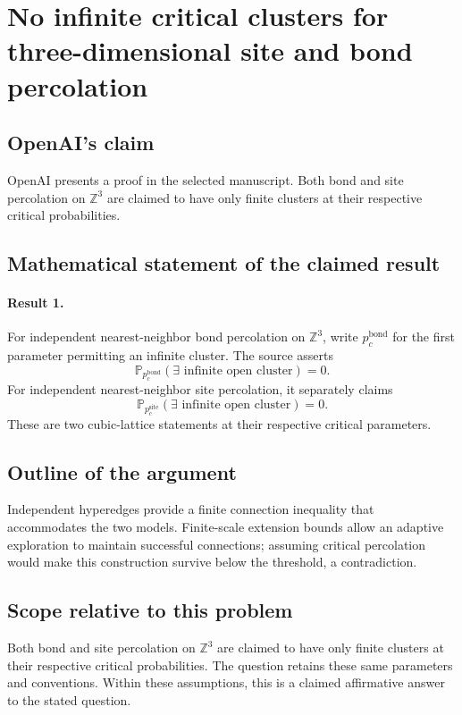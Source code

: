 \documentclass[11pt]{article}
\begin{document}
\section*{No infinite critical clusters for three-dimensional site and bond percolation}

\subsection{OpenAI's claim}
OpenAI presents a proof in the selected manuscript. Both bond and site percolation on $\mathbb Z^3$ are claimed to have only finite clusters at their respective critical probabilities.

\subsection{Mathematical statement of the claimed result}
\paragraph{Result 1.} For independent nearest-neighbor bond percolation on \(\mathbb Z^3\), write \(p_c^{\mathrm{bond}}\) for the first parameter permitting an infinite cluster. The source asserts
\[
 \mathbb P_{p_c^{\mathrm{bond}}}(\exists\text{ infinite open cluster})=0.
\]
For independent nearest-neighbor site percolation, it separately claims
\[
 \mathbb P_{p_c^{\mathrm{site}}}(\exists\text{ infinite open cluster})=0.
\]
These are two cubic-lattice statements at their respective critical parameters.

\subsection{Outline of the argument}
Independent hyperedges provide a finite connection inequality that accommodates the two models. Finite-scale extension bounds allow an adaptive exploration to maintain successful connections; assuming critical percolation would make this construction survive below the threshold, a contradiction.

\subsection{Scope relative to this problem}
Both bond and site percolation on $\mathbb Z^3$ are claimed to have only finite clusters at their respective critical probabilities. The question retains these same parameters and conventions. Within these assumptions, this is a claimed affirmative answer to the stated question.
\end{document}
